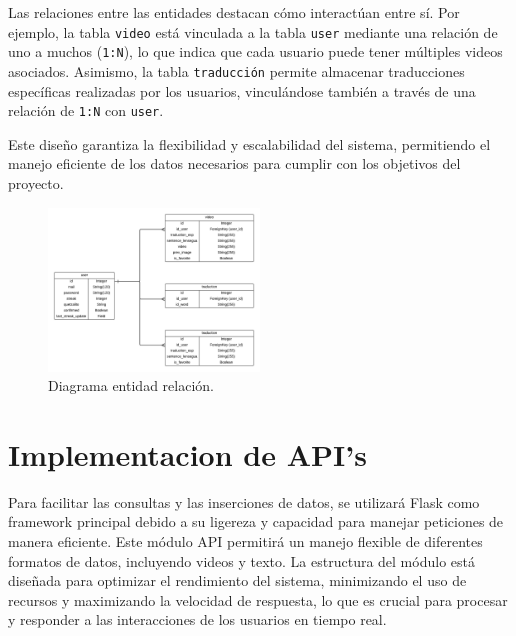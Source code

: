Las relaciones entre las entidades destacan cómo interactúan entre sí. Por ejemplo, la tabla \texttt{video} está vinculada a la tabla \texttt{user} mediante una relación de uno a muchos (\texttt{1:N}), lo que indica que cada usuario puede tener múltiples videos asociados. Asimismo, la tabla \texttt{traducción} permite almacenar traducciones específicas realizadas por los usuarios, vinculándose también a través de una relación de \texttt{1:N} con \texttt{user}.

Este diseño garantiza la flexibilidad y escalabilidad del sistema, permitiendo el manejo eficiente de los datos necesarios para cumplir con los objetivos del proyecto.

\begin{figure}[H]
    \centering
    \includegraphics[width=0.5\textwidth]{figuras/entidad_relacion.png}
    \caption{Diagrama entidad relación.}
    \label{fig:entidad_relacion}
\end{figure}


\section{Implementacion de API's}

Para facilitar las consultas y las inserciones de datos, se utilizará Flask como framework principal debido a su ligereza y capacidad para manejar peticiones de manera eficiente. Este módulo API permitirá un manejo flexible de diferentes formatos de datos, incluyendo videos y texto. La estructura del módulo está diseñada para optimizar el rendimiento del sistema, minimizando el uso de recursos y maximizando la velocidad de respuesta, lo que es crucial para procesar y responder a las interacciones de los usuarios en tiempo real.


